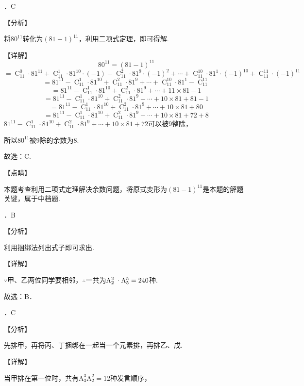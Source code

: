 ．C

\noindent 【分析】

\noindent 将$80^{11} $转化为$\left(81-1\right)^{11} $，利用二项式定理，即可得解.

\noindent 【详解】
\[80^{11} =\left(81-1\right)^{11} \] 
\[=\mathop{C}\nolimits_{11}^{0} \cdot 81^{11} +\mathop{C}\nolimits_{11}^{1} \cdot 81^{10} \cdot \left(-1\right)+\mathop{C}\nolimits_{11}^{2} \cdot 81^{9} \cdot \left(-1\right)^{2} +\cdots +\mathop{C}\nolimits_{11}^{10} \cdot 81^{1} \cdot \left(-1\right)^{10} +\mathop{C}\nolimits_{11}^{11} \cdot \left(-1\right)^{11} \] 
\[=81^{11} -\mathop{C}\nolimits_{11}^{1} \cdot 81^{10} +\mathop{C}\nolimits_{11}^{2} \cdot 81^{9} +\cdots +\mathop{C}\nolimits_{11}^{10} \cdot 81^{1} -\mathop{C}\nolimits_{11}^{11} \] 
\[=81^{11} -\mathop{C}\nolimits_{11}^{1} \cdot 81^{10} +\mathop{C}\nolimits_{11}^{2} \cdot 81^{9} +\cdots +11\times 81-1\] 
\[=81^{11} -\mathop{C}\nolimits_{11}^{1} \cdot 81^{10} +\mathop{C}\nolimits_{11}^{2} \cdot 81^{9} +\cdots +10\times 81+81-1\] 
\[=81^{11} -\mathop{C}\nolimits_{11}^{1} \cdot 81^{10} +\mathop{C}\nolimits_{11}^{2} \cdot 81^{9} +\cdots +10\times 81+80\] 
\[=81^{11} -\mathop{C}\nolimits_{11}^{1} \cdot 81^{10} +\mathop{C}\nolimits_{11}^{2} \cdot 81^{9} +\cdots +10\times 81+72+8\] 
$81^{11} -\mathop{C}\nolimits_{11}^{1} \cdot 81^{10} +\mathop{C}\nolimits_{11}^{2} \cdot 81^{9} +\cdots +10\times 81+72$可以被9整除，

\noindent 所以$80^{11} $被9除的余数为8.

\noindent 故选：C.

\noindent 【点睛】

\noindent 本题考查利用二项式定理解决余数问题，将原式变形为$\left(81-1\right)^{11} $是本题的解题关键，属于中档题.

．B

\noindent 【分析】

\noindent 利用捆绑法列出式子即可求出.

\noindent 【详解】

\noindent $\because $甲、乙两位同学要相邻，$\therefore $一共为$\mathrm A_{2}^{2} {\it \; }\cdot \mathrm A_{5}^{5} =240$种.

\noindent 故选：B．

．C

\noindent 【分析】

\noindent 先排甲，再将丙、丁捆绑在一起当一个元素排，再排乙、戊.

\noindent 【详解】

\noindent 当甲排在第一位时，共有$\mathrm A_{3}^{3} \mathrm A_{2}^{2} =12$种发言顺序，

